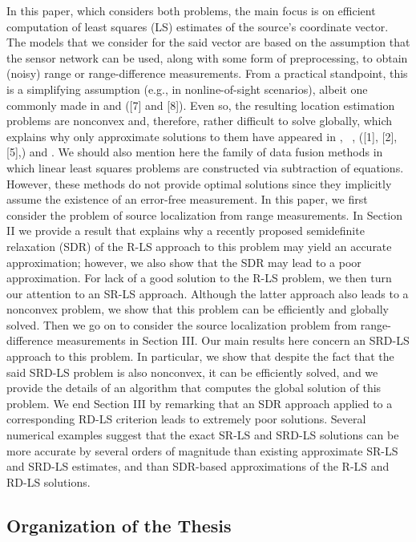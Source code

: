 In this paper, which considers both problems, the main focus is on efficient computation of least squares (LS) estimates of the source’s coordinate vector. The models that we consider for the said vector are based on  the assumption that the sensor network can be used, along with some form of preprocessing, to obtain (noisy) range or range-difference measurements. From a practical standpoint, this is a simplifying assumption (e.g., in nonline-of-sight scenarios), albeit one commonly made in \cite{Cheung} and \cite{classMDS} ([7] and [8]). Even so, the resulting location estimation problems are nonconvex and, therefore, rather difficult to solve globally, which explains why only approximate solutions to them have appeared in \cite{SmithAbel}, ~, \cite{LiHu} ([1], [2], [5],) and \cite{Cheung}. We should also mention here the family of data fusion methods \cite{Sayed} in which linear least squares problems are constructed via subtraction of equations. However, these methods do not provide optimal solutions since they implicitly assume the existence of an error-free measurement. In this paper, we first consider the problem of source localization from range measurements. In Section II we provide a result that explains why a recently proposed semidefinite relaxation (SDR) \cite{Cheung} of the R-LS approach to this problem may yield an accurate approximation; however, we also show that the SDR may lead to a poor approximation. For lack of a good solution to the R-LS problem, we then turn our attention to an SR-LS approach. Although the latter approach also leads to a nonconvex problem, we show that this problem can be efficiently and globally solved. Then we go on to consider the source localization problem from range-difference measurements in Section III. Our main results here concern an SRD-LS approach to this problem. In particular, we show that despite the fact that the said SRD-LS problem is also nonconvex, it can be efficiently solved, and we provide the details of an algorithm that computes the global solution of this problem. We end Section III by remarking that an SDR approach applied to a corresponding RD-LS criterion leads to extremely poor solutions. Several numerical examples suggest that the exact SR-LS and SRD-LS solutions can be more accurate by several orders of magnitude than existing approximate SR-LS and SRD-LS estimates, and than SDR-based approximations of the R-LS and
RD-LS solutions.

\subsection{Organization of the Thesis} \label{organization}

